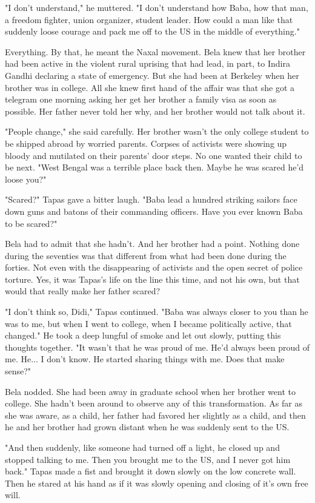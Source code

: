 \documentclass{amsart}
\begin{document}
"I don't understand," he muttered. "I don't understand how Baba, how that man, a freedom fighter, union organizer, student leader. How could a man like that suddenly loose courage and pack me off to the US in the middle of everything."

Everything. By that, he meant the Naxal movement. Bela knew that her brother had been active in the violent rural uprising that had lead, in part, to Indira Gandhi declaring a state of emergency. But she had been at Berkeley when her brother was in college. All she knew first hand of the affair was that she got a telegram one morning asking her get her brother a family visa as soon as possible. Her father never told her why, and her brother would not talk about it.

"People change," she said carefully. Her brother wasn't the only college student to be shipped abroad by worried parents. Corpses of activists were showing up bloody and mutilated on their parents' door steps. No one wanted their child to be next. "West Bengal was a terrible place back then. Maybe he was scared he'd loose you?"

"Scared?" Tapas gave a bitter laugh. "Baba lead a hundred striking sailors face down guns and batons of their commanding officers. Have you ever known Baba to be scared?"

Bela had to admit that she hadn't. And her brother had a point. Nothing done during the seventies was that different from what had been done during the forties. Not even with the disappearing of activists and the open secret of police torture. Yes, it was Tapas's life on the line this time, and not his own, but that would that really make her father scared?


"I don't think so, Didi," Tapas continued. "Baba was always closer to you than he was to me, but when I went to college, when I became politically active, that changed." He took a deep lungful of smoke and let out slowly, putting this thoughts together. "It wasn't that he was proud of me. He'd always been proud of me. He... I don't know. He started sharing things with me. Does that make sense?" 

Bela nodded. She had been away in graduate school when her brother went to college. She hadn't been around to observe any of this transformation. As far as she was aware, as a child, her father had favored her slightly as a child, and then he and her brother had grown distant when he was suddenly sent to the US.

"And then suddenly, like someone had turned off a light, he closed up and stopped talking to me. Then you brought me to the US, and I never got him back." Tapas made a fist and brought it down slowly on the low concrete wall. Then he stared at his hand as if it was slowly opening and closing of it's own free will. 
\end{document}
